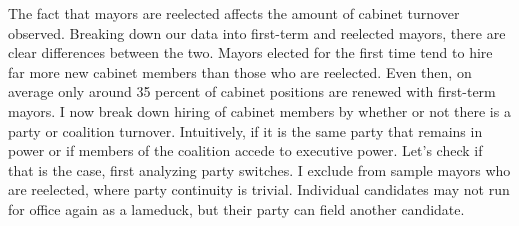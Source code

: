 \documentclass[12pt,]{book}
\begin{document}
The fact that mayors are reelected affects the amount of cabinet turnover observed. Breaking down our data into first-term and reelected mayors, there are clear differences between the two. Mayors elected for the first time tend to hire far more new cabinet members than those who are reelected. Even then, on average only around 35 percent of cabinet positions are renewed with first-term mayors. I now break down hiring of cabinet members by whether or not there is a party or coalition turnover. Intuitively, if it is the same party that remains in power or if members of the coalition accede to executive power. Let's check if that is the case, first analyzing party switches. I exclude from sample mayors who are reelected, where party continuity is trivial. Individual candidates may not run for office again as a lameduck, but their party can field another candidate.
\end{document}
